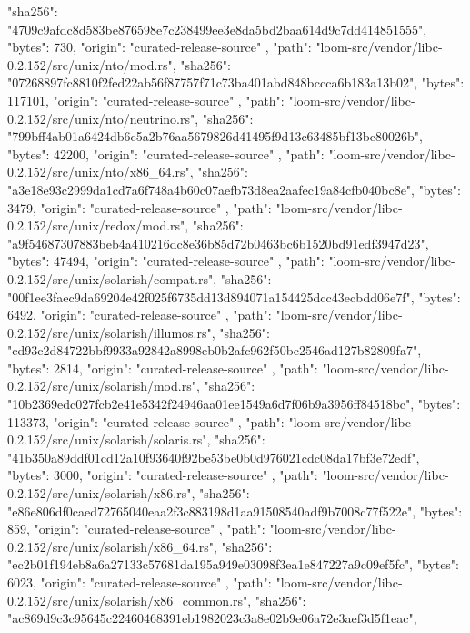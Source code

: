 {{      "sha256": "4709c9afdc8d583be876598e7c238499ee3e8da5bd2baa614d9c7dd414851555",
      "bytes": 730,
      "origin": "curated-release-source"
    },
    {
      "path": "loom-src/vendor/libc-0.2.152/src/unix/nto/mod.rs",
      "sha256": "07268897fc8810f2fed22ab56f87757f71c73ba401abd848bccca6b183a13b02",
      "bytes": 117101,
      "origin": "curated-release-source"
    },
    {
      "path": "loom-src/vendor/libc-0.2.152/src/unix/nto/neutrino.rs",
      "sha256": "799bff4ab01a6424db6c5a2b76aa5679826d41495f9d13c63485bf13bc80026b",
      "bytes": 42200,
      "origin": "curated-release-source"
    },
    {
      "path": "loom-src/vendor/libc-0.2.152/src/unix/nto/x86_64.rs",
      "sha256": "a3e18e93c2999da1cd7a6f748a4b60c07aefb73d8ea2aafec19a84cfb040bc8e",
      "bytes": 3479,
      "origin": "curated-release-source"
    },
    {
      "path": "loom-src/vendor/libc-0.2.152/src/unix/redox/mod.rs",
      "sha256": "a9f54687307883beb4a410216dc8e36b85d72b0463bc6b1520bd91edf3947d23",
      "bytes": 47494,
      "origin": "curated-release-source"
    },
    {
      "path": "loom-src/vendor/libc-0.2.152/src/unix/solarish/compat.rs",
      "sha256": "00f1ee3faec9da69204e42f025f6735dd13d894071a154425dcc43ecbdd06e7f",
      "bytes": 6492,
      "origin": "curated-release-source"
    },
    {
      "path": "loom-src/vendor/libc-0.2.152/src/unix/solarish/illumos.rs",
      "sha256": "cd93c2d84722bbf9933a92842a8998eb0b2afc962f50bc2546ad127b82809fa7",
      "bytes": 2814,
      "origin": "curated-release-source"
    },
    {
      "path": "loom-src/vendor/libc-0.2.152/src/unix/solarish/mod.rs",
      "sha256": "10b2369edc027fcb2e41e5342f24946aa01ee1549a6d7f06b9a3956ff84518bc",
      "bytes": 113373,
      "origin": "curated-release-source"
    },
    {
      "path": "loom-src/vendor/libc-0.2.152/src/unix/solarish/solaris.rs",
      "sha256": "41b350a89ddf01cd12a10f93640f92be53be0b0d976021cdc08da17bf3e72edf",
      "bytes": 3000,
      "origin": "curated-release-source"
    },
    {
      "path": "loom-src/vendor/libc-0.2.152/src/unix/solarish/x86.rs",
      "sha256": "e86e806df0caed72765040eaa2f3c883198d1aa91508540adf9b7008c77f522e",
      "bytes": 859,
      "origin": "curated-release-source"
    },
    {
      "path": "loom-src/vendor/libc-0.2.152/src/unix/solarish/x86_64.rs",
      "sha256": "ec2b01f194eb8a6a27133c57681da195a949e03098f3ea1e847227a9c09ef5fc",
      "bytes": 6023,
      "origin": "curated-release-source"
    },
    {
      "path": "loom-src/vendor/libc-0.2.152/src/unix/solarish/x86_common.rs",
      "sha256": "ac869d9c3c95645c22460468391eb1982023c3a8e02b9e06a72e3aef3d5f1eac",
}}
